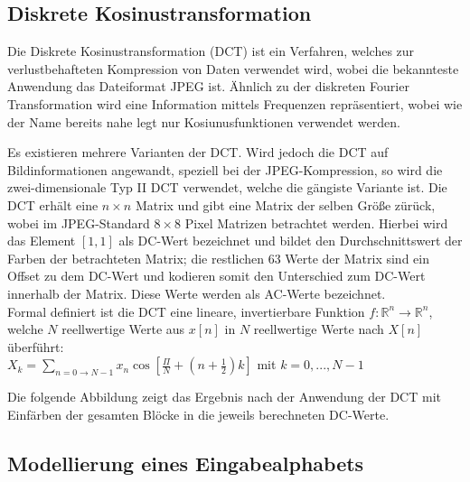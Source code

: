 \subsection{Diskrete Kosinustransformation}
\label{sec:dct}

Die Diskrete Kosinustransformation (DCT)\cite{Khayam03thediscrete} ist ein Verfahren, welches zur verlustbehafteten Kompression von Daten verwendet wird, wobei die bekannteste Anwendung das Dateiformat JPEG ist.
Ähnlich zu der diskreten Fourier Transformation wird eine Information mittels Frequenzen repräsentiert, wobei wie der Name bereits nahe legt nur Kosiunusfunktionen verwendet werden.


Es existieren mehrere Varianten der DCT.
Wird jedoch die DCT auf Bildinformationen angewandt, speziell bei der JPEG-Kompression, so wird die zwei-dimensionale Typ II DCT verwendet, welche die gängiste Variante ist.
Die DCT erhält eine $n \times  n$ Matrix und gibt eine Matrix der selben Größe zürück, wobei im JPEG-Standard $8 \times 8$ Pixel Matrizen betrachtet werden.
Hierbei wird das Element $[1,1]$ als DC-Wert bezeichnet und bildet den Durchschnittswert der Farben der betrachteten Matrix; die restlichen 63 Werte der Matrix sind ein Offset zu dem DC-Wert und kodieren somit den Unterschied zum DC-Wert innerhalb der Matrix.
Diese Werte werden als AC-Werte bezeichnet.\\
Formal definiert ist die DCT eine lineare, invertierbare Funktion $f : \mathbb{R}^n \rightarrow \mathbb{R}^n$, welche $N$ reellwertige Werte aus $x[n]$ in $N$ reellwertige Werte nach $X[n]$ überführt:\\
$X_k = \sum\limits_{n=0\rightarrow N-1} x_n \cos [\frac{\Pi}{N} + (n + \frac{1}{2}) k ]$ mit $k = 0,..., N-1$

Die folgende Abbildung zeigt das Ergebnis nach der Anwendung der DCT mit Einfärben der gesamten Blöcke in die jeweils berechneten DC-Werte.

\subsection{Modellierung eines Eingabealphabets}
\label{sec:modellierungeingabealphabet}

